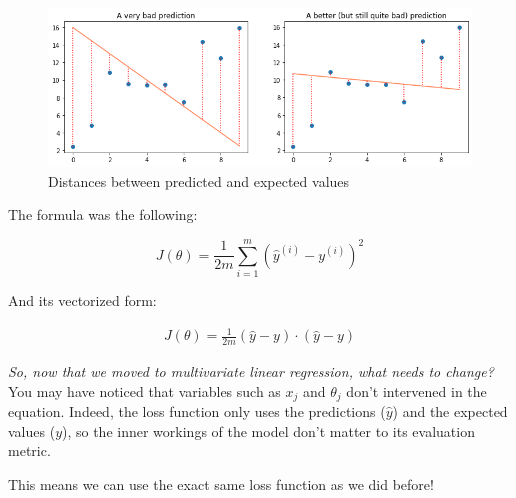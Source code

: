 \begin{figure}[!h]
    \centering
    \includegraphics[scale=0.5]{assets/bad_pred_with_distance.png}
    \caption{Distances between predicted and expected values}
\end{figure}

The formula was the following: 

$$
J(\theta) = \frac{1}{2m}\sum_{i=1}^{m}(\hat{y}^{(i)} - y^{(i)})^2
$$

And its vectorized form:

$$
\begin{matrix}
J(\theta) = \frac{1}{2m}(\hat{y} - y)\cdot(\hat{y}- y)
\end{matrix}
$$  

\textit{So, now that we moved to multivariate linear regression, what needs to change?}\newline
You may have noticed that variables such as $x_j$ and $\theta_j$ don't intervened in the equation.
Indeed, the loss function only uses the predictions ($\hat{y}$) and the expected values ($y$), so the inner workings of the model don't matter to its evaluation metric.

This means we can use the exact same loss function as we did before!
